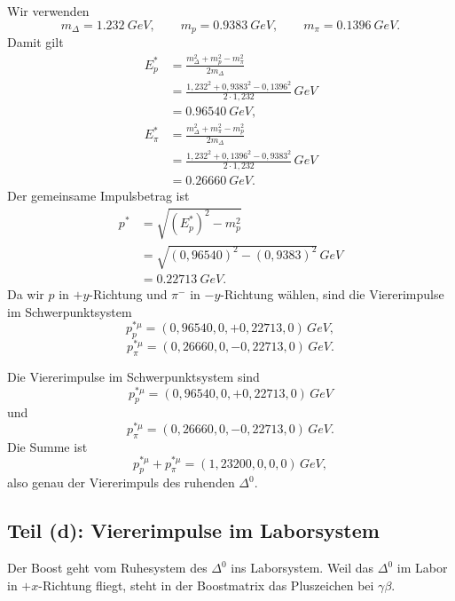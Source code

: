 \documentclass[11pt,a4paper]{scrartcl}
\newcommand{\paren}[1]{\left( #1 \right)}
\newcommand{\GeV}{\si{GeV}}
\newcommand{\Dzero}{\Delta^0}
\newcommand{\fourp}[4]{\paren{#1,#2,#3,#4}}
\theoremstyle{definition}
\theoremstyle{plain}
\theoremstyle{remark}
\begin{document}
\begin{calculationbox}
Wir verwenden
\[
    m_\Delta=\SI{1,232}{GeV},
    \qquad
    m_p=\SI{0,9383}{GeV},
    \qquad
    m_\pi=\SI{0,1396}{GeV}.
\]
Damit gilt
\begin{align*}
    E_p^\ast
    &=\frac{m_\Delta^2+m_p^2-m_\pi^2}{2m_\Delta} \\
    &=\frac{1,232^2+0,9383^2-0,1396^2}{2\cdot 1,232}\,\GeV \\
    &=\SI{0,96540}{GeV},\\[0.5em]
    E_\pi^\ast
    &=\frac{m_\Delta^2+m_\pi^2-m_p^2}{2m_\Delta} \\
    &=\frac{1,232^2+0,1396^2-0,9383^2}{2\cdot 1,232}\,\GeV \\
    &=\SI{0,26660}{GeV}.
\end{align*}
Der gemeinsame Impulsbetrag ist
\begin{align*}
    p^\ast
    &=\sqrt{(E_p^\ast)^2-m_p^2} \\
    &=\sqrt{(0,96540)^2-(0,9383)^2}\,\GeV \\
    &=\SI{0,22713}{GeV}.
\end{align*}
Da wir $p$ in $+y$-Richtung und $\pi^-$ in $-y$-Richtung w\"ahlen, sind die Viererimpulse im Schwerpunktsystem
\[
    p_p^{\ast\mu}=\fourp{0,96540}{0}{+0,22713}{0}\,\GeV,
\]
\[
    p_\pi^{\ast\mu}=\fourp{0,26660}{0}{-0,22713}{0}\,\GeV.
\]
\end{calculationbox}

\begin{answerbox}
Die Viererimpulse im Schwerpunktsystem sind
\[
    \boxed{p_p^{\ast\mu}=\fourp{0,96540}{0}{+0,22713}{0}\,\GeV}
\]
und
\[
    \boxed{p_\pi^{\ast\mu}=\fourp{0,26660}{0}{-0,22713}{0}\,\GeV}.
\]
Die Summe ist
\[
    p_p^{\ast\mu}+p_\pi^{\ast\mu}
    =\fourp{1,23200}{0}{0}{0}\,\GeV,
\]
also genau der Viererimpuls des ruhenden $\Dzero$.
\end{answerbox}

\subsection{Teil (d): Viererimpulse im Laborsystem}

\begin{presentationbox}
Der Boost geht vom Ruhesystem des $\Dzero$ ins Laborsystem. Weil das $\Dzero$ im Labor in $+x$-Richtung fliegt, steht in der Boostmatrix das Pluszeichen bei $\gamma\beta$.
\end{presentationbox}
\end{document}
